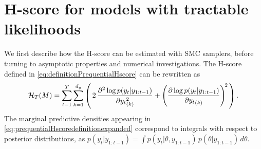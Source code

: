 \documentclass[12pt]{article}
\theoremstyle{plain}
\theoremstyle{definition}
\begin{document}
	\section{H-score for models with tractable likelihoods}
	\label{sec:tractable_likelihoods}
	We first describe how the H-score can be estimated with SMC samplers, before turning to asymptotic properties
	and numerical investigations. The H-score defined in \eqref{eq:definitionPrequentialHscore} can be rewritten as 
	{\small
		\begin{align}
		\mathcal{H}_{T}(M) = \sum_{t=1}^T \sum_{k=1}^{d_y}\left(\,2\,\frac{\partial^2 \log p(y_t|y_{1:t-1})}{\partial {y_t}_{(k)}^{2^{\vphantom{S}}}}+ \left(\frac{\partial \log p(y_t|y_{1:t-1})}{\partial {y_t}_{(k)}}\right)^{\!2\,}\right).
		\label{eq:prequentialHscoredefinitionexpanded}
		\end{align}
	}The marginal
	predictive densities appearing in \eqref{eq:prequentialHscoredefinitionexpanded} correspond to 
	integrals with respect to posterior distributions, as $p(y_t|y_{1:t-1})=\int p(y_t|\theta,y_{1:t-1})\,p(\theta|y_{1:t-1})\,d\theta$.
	
\end{document}
